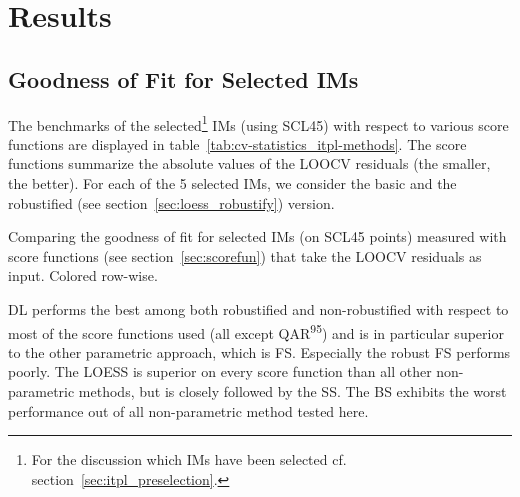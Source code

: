 \chapter{Results}\label{sec:results}

\section{Goodness of Fit for Selected {{IM}}s}{
	\label{sec:results_itpl}
	The benchmarks of the selected\footnote{\label{note:selected-IM} For the discussion which IMs have been selected cf. section~\ref{sec:itpl_preselection}.} {{IM}}s (using SCL45) with respect to various score functions are displayed in table~\ref{tab:cv-statistics_itpl-methods}. The score functions summarize the absolute values of the LOOCV residuals (the smaller, the better). For each of the 5 selected {{IM}}s, we consider the basic and the robustified (see section~\ref{sec:loess_robustify}) version.

	\begin{table}[h]
		\begin{center}
			\caption[Goodness of fit for {{IM}}s (on SCL45 points) measured with score functions.]{Comparing the goodness of fit for selected {{IM}}s (on SCL45 points) measured with score functions (see section~\ref{sec:scorefun}) that take the LOOCV residuals as input. Colored row-wise.}
			\scriptsize
			
			\normalsize
			\label{tab:cv-statistics_itpl-methods}
		\end{center}
	\end{table}
	
	DL performs the best among both robustified and non-robustified with respect to most of the score functions used (all except QAR\textsuperscript{95}) and is in particular superior to the other parametric approach, which is FS. Especially the robust FS performs poorly. The LOESS is superior on every score function than all other non-parametric methods, but is closely followed by the SS. The BS exhibits the worst performance out of all non-parametric method tested here. 
}


